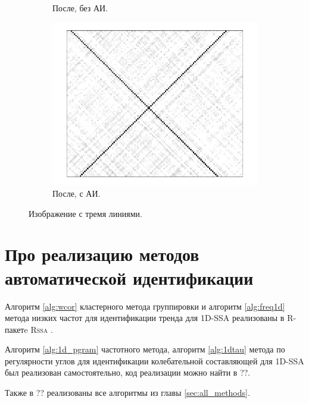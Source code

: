 \documentclass[specialist,
               substylefile = spbu.rtx,
               subf,href,colorlinks=true, 12pt]{disser}
\begin{document}
\begin{figure}[hhh!]
\begin{subfigure}[b]{0.32\textwidth}
        \caption{После, без АИ.}
        \label{fig:a_many_after}
    \end{subfigure}
     \begin{subfigure}[b]{0.32\textwidth}
       \includegraphics[width=\textwidth]{auto_lines}
        \caption{После, с АИ.}
        \label{fig:a_many_after2}
    \end{subfigure}
       \caption{Изображение с тремя линиями.}\label{fig:a_many}
\end{figure}

\chapter{Про реализацию методов автоматической идентификации}
Алгоритм \ref{alg:wcor} кластерного метода группировки и алгоритм \ref{alg:freq1d} метода низких частот для идентификации тренда для 1D-SSA  реализованы в R-пакетe \textsc{Rssa} \cite{Rssa, Golyandina.Korobeynikov2013}.

Алгоритм \ref{alg:1d_pgram} частотного метода, алгоритм \ref{alg:1dtau} метода по регулярности углов для идентификации колебательной составляющей для 1D-SSA был реализован самостоятельно, код реализации можно найти в ??.

Также в ?? реализованы все алгоритмы из главы \ref{sec:all_methods}.
\end{document}
